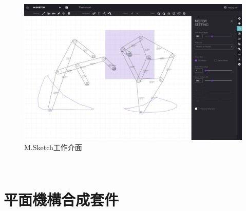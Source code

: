 \documentclass[14pt,a4paper]{report}  %
\begin{document}
 		\begin{figure}[H]
        \centering
        \includegraphics[scale=0.25]{M.Sketch.jpg} 
        \caption{M.Sketch工作介面} 
        \label{fig:scale}
    	\end{figure}
\hspace*{\fill} \\
\newpage
      \section{平面機構合成套件}
\end{document}
